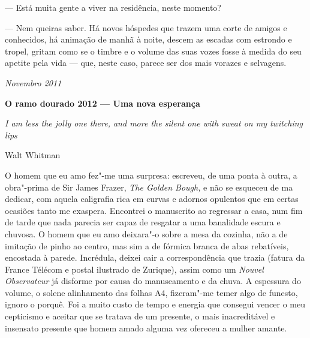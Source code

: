 --- Está muita gente a viver na residência, neste momento?

--- Nem queiras saber. Há novos hóspedes que trazem uma corte de amigos e
  conhecidos, há animação de manhã à
noite, descem as escadas com estrondo e tropel, gritam como se o timbre
e o volume das suas vozes fosse à medida do seu apetite pela vida ---
que, neste caso, parece ser dos mais vorazes e selvagens.

\begin{flushright}
\emph{Novembro 2011}
\end{flushright}
\pagebreak
\thispagestyle{empty}

\movetooddpage\vspace*{1.8cm}
\noindent{}\textbf{O ramo dourado 2012 --- Uma nova esperança}
\bigskip

\epigraph{\emph{I am less the jolly one there, and more the silent one with
sweat on my twitching lips}}{Walt Whitman}

O homem que eu amo fez"-me uma surpresa: escreveu, de uma ponta à outra, a
obra"-prima de Sir James Frazer,
\emph{The Golden Bough, }e não se esqueceu de ma dedicar, com aquela
caligrafia rica em curvas e adornos opulentos que em certas ocasiões
tanto me exaspera. Encontrei o manuscrito ao regressar a casa, num fim
de tarde que nada parecia ser capaz de resgatar a uma banalidade escura
e chuvosa. O homem que eu amo deixara"-o sobre a mesa da cozinha, não a
de imitação de pinho ao centro, mas sim a de fórmica branca de abas
rebatíveis, encostada à parede. Incrédula, deixei cair a correspondência que trazia (fatura da France Télécom e postal ilustrado de
Zurique), assim como um \emph{Nouvel Observateur }já disforme por causa
do manuseamento e da chuva. A espessura do volume, o solene
alinhamento das folhas A4, fizeram"-me temer algo de funesto, ignoro o porquê. Foi a muito custo de tempo e
energia que consegui vencer o meu cepticismo e aceitar que se tratava de
um presente, o mais inacreditável e insensato presente que homem amado
alguma vez ofereceu a mulher amante.


